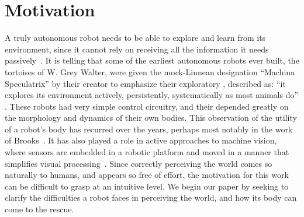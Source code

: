 
\section{Motivation}

A truly autonomous robot needs to be able to explore and learn from
its environment, since it cannot rely on receiving all the information
it needs passively~\cite{whaite97autonomous}.
It is telling that some of the earliest autonomous robots ever built,
the tortoises of W. Grey Walter, were given the mock-Linnean
designation ``Machina Speculatrix'' by their creator to emphasize their exploratory
\ahhbehavior{}, described as: ``it explores its environment actively,
persistently, systematically as most animals do''
\cite{walter50imitation}.
These robots had very simple control circuitry, and their \ahhbehavior{}
depended greatly on the morphology and dynamics of their own bodies.
%
This observation of the utility of a robot's body has recurred over
the years, perhaps most notably in the work of
Brooks~\cite{group-AAAI-98}.  It has also played a role in active
approaches to machine vision, where sensors are embedded in a robotic
platform and moved in a manner that simplifies visual
processing~\cite{ballard91animate}.
%
Since correctly perceiving the world comes so naturally to humans, and
appears so free of effort, the motivation for this work can be
difficult to grasp at an intuitive level.  We begin our paper by
seeking to clarify the difficulties a robot faces in perceiving the
world, and how its body can come to the rescue.



